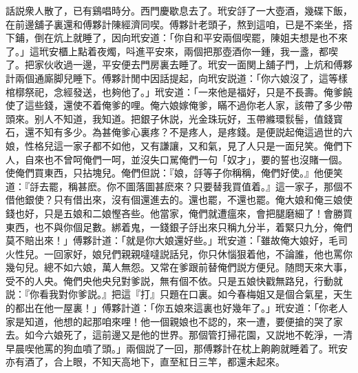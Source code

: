 話説衆人散了，已有鷄唱時分。西門慶歇息去了。玳安㧱了一大壺酒，幾碟下飯，在前邊舖子裏還和傅夥計陳經濟同喫。傅夥計老頭子，熬到這咱，已是不楽坐，搭下鋪，倒在炕上就睡了，因向玳安道：「你自和平安兩個喫罷，陳姐夫想是也不來了。」這玳安櫃上點着夜燭，呌進平安來，兩個把那壺酒你一鍾，我一盞，都喫了。把家伙收過一邊，平安便去門房裏去睡了。玳安一面関上舖子門，上炕和傅夥計兩個通廝脚兒睡下。傅夥計閒中因話提起，向玳安説道：「你六娘沒了，這等樣棺槨祭祀，念經發送，也夠他了。」玳安道：「一來他是福好，只是不長壽。俺爹饒使了這些錢，還使不着俺爹的哩。俺六娘嫁俺爹，瞞不過你老人家，該帶了多少帶頭來。别人不知道，我知道。把銀子休説，光金珠玩好，玉帶縧環䯼髻，值錢寳石，還不知有多少。為甚俺爹心裏疼？不是疼人，是疼錢。是便説起俺這過世的六娘，性格兒這一家子都不如他，又有謙讓，又和氣，見了人只是一面兒笑。俺們下人，自來也不曾呵俺們一呵，並沒失口駡俺們一句「奴才」，要的誓也沒賭一個。使俺們買東西，只拈塊兒。俺們但説：『娘，㧱等子你稱稱，俺們好使。』他便笑道：『㧱去罷，稱甚麽。你不圖落圖甚麽來？只要替我買值着。』這一家子，那個不借他銀使？只有借出來，沒有個還進去的。還也罷，不還也罷。俺大娘和俺三娘使錢也好，只是五娘和二娘慳吝些。他當家，俺們就遭瘟來，會把腿磨細了！會勝買東西，也不與你個足數。綁着鬼，一錢銀子㧱出來只稱九分半，着緊只九分，俺們莫不賠出來！」傅夥計道：「就是你大娘還好些。」玳安道：「雖故俺大娘好，毛司火性兒。一回家好，娘兒們親親噠噠説話兒，你只休惱狠着他，不論誰，他也罵你幾句兒。總不如六娘，萬人無怨。又常在爹跟前替俺們説方便兒。随問天來大事，受不的人央。俺們央他央兒對爹説，無有個不依。只是五娘快戳無路兒，行動就説：『你看我對你爹説。』把這『打』只題在口裏。如今春梅姐又是個合氣星，天生的都出在他一屋裏！」傅夥計道：「你五娘來這裏也好幾年了。」玳安道：「你老人家是知道，他想的起那咱來哩！他一個親娘也不認的，來一遭，要便搶的哭了家去。如今六娘死了，這前邊又是他的世界。那個管打掃花園，又説地不乾淨，一清早晨喫他罵的狗血噴了頭。」兩個説了一回，那傅夥計在枕上齁齁就睡着了。玳安亦有酒了，合上眼，不知天高地下，直至紅日三竿，都還未起來。

